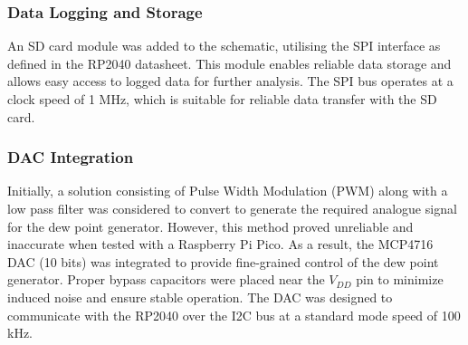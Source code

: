 \subsubsection{Data Logging and Storage}

An SD card module was added to the schematic, utilising the 
SPI interface as defined in the RP2040 datasheet. This module enables reliable data storage 
and allows easy access to logged data for further analysis. The SPI bus operates at a clock 
speed of 1 MHz, which is suitable for reliable data transfer with the SD card.

\subsubsection{DAC Integration}

Initially, a solution consisting of Pulse Width Modulation (PWM) 
along with a low pass filter was considered to convert to generate the required analogue signal 
for the dew point generator. However, this method proved unreliable and inaccurate when tested 
with a Raspberry Pi Pico. As a result, the MCP4716 DAC (10 bits) was integrated to provide fine-grained control of 
the dew point generator. Proper bypass capacitors were placed near the $V_{DD}$ pin 
to minimize induced noise and ensure stable operation. The DAC was designed to communicate with the RP2040 
over the I2C bus at a standard mode speed of 100 kHz.